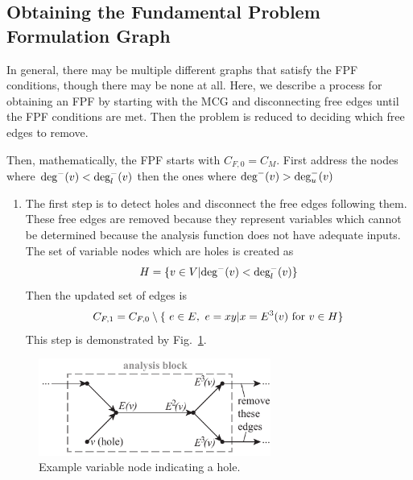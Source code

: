 \subsection{Obtaining the Fundamental Problem Formulation Graph}
In general, there may be multiple different graphs that satisfy the FPF conditions, though there may be none at all. Here, we describe a process for obtaining an FPF by starting with the MCG and disconnecting free edges until the FPF conditions are met. Then the problem is reduced to deciding which free edges to remove.

Then, mathematically, the FPF starts with $C_{F,0} = C_M$.
First address the nodes where $\textrm{deg}^-(v) < \textrm{deg}_l^-(v)$ then the ones where $\textrm{deg}^-(v) > \textrm{deg}_u^-(v)$

\begin{enumerate}
\item The first step is to detect holes and disconnect the free edges following them. These free edges are removed because they represent variables which cannot be determined because the analysis function does not have adequate inputs. The set of variable nodes which are holes is created as
\begin{equation}
H = \{v \in V | \textrm{deg}^-(v) < \textrm{deg}_l^-(v) \}
\end{equation}
Then the updated set of edges is
\begin{equation}
C_{F,1} = C_{F,0} \setminus \{\ e \in E, \ e=xy | x=E^3(v) \textrm{ for } v \in H\}
\end{equation}
This step is demonstrated by Fig.~\ref{f:holes}.
\end{enumerate}
\begin{figure}[htb!]
	\begin{center}
	\includegraphics[width=3in]{images/analysis_block_hole}
	\end{center}
	\vspace{-20pt}
\caption{Example variable node indicating a hole.}
\label{f:holes}
\end{figure}


